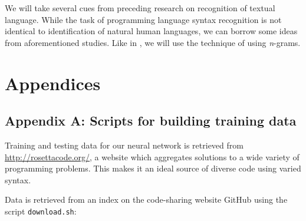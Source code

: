 \documentclass{article}
\begin{document}
We will take several cues from preceding research on recognition of textual language. While the task of programming language syntax recognition is not identical to identification of natural human languages, we can borrow some ideas from aforementioned studies. Like in \cite{langidstanford}, we will use the technique of using \textit{n}-grams.

\section{Appendices}

\label{sec:appendix_a}
\subsection{Appendix A: Scripts for building training data}
Training and testing data for our neural network is retrieved from \url{http://rosettacode.org/}, a website which aggregates solutions to a wide variety of programming problems. This makes it an ideal source of diverse code using varied syntax.

Data is retrieved from an index on the code-sharing website GitHub\cite{rosettacodegh} using the script \texttt{download.sh}:
\inputminted{bash}{data/download.sh}


\end{document}
